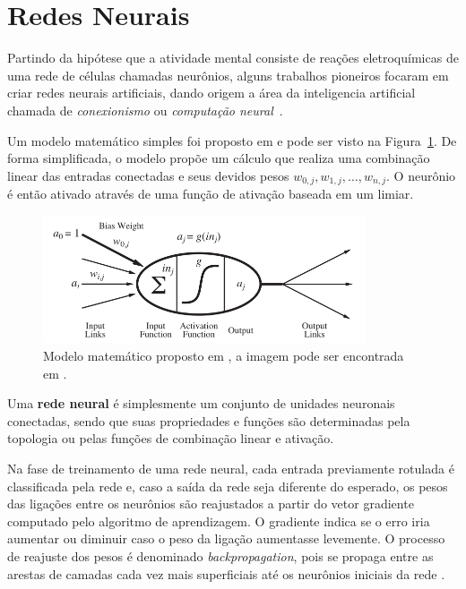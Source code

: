 \section{Redes Neurais}
\label{sec:redesneurais}

Partindo da hipótese que a atividade mental consiste de reações eletroquímicas de uma rede de células chamadas neurônios, alguns trabalhos pioneiros focaram em criar redes neurais artificiais, dando origem a área da inteligencia artificial chamada de \textit{conexionismo} ou \textit{computação neural}~\cite{russel}.

Um modelo matemático simples foi proposto em  e pode ser visto na Figura~\ref{fig:neuron}. De forma simplificada, o modelo propõe um cálculo que realiza uma combinação linear das entradas conectadas e seus devidos pesos $w_{0,j}, w_{1,j}, \dots,w_{n,j}$. O neurônio é então ativado através de uma função de ativação baseada em um limiar.

\begin{figure}[!ht]
  \centering
  \includegraphics[width=0.85\textwidth]{dados/figuras/neuron.png}
  \caption{Modelo matemático proposto em , a imagem pode ser encontrada em \cite{russel}.}
  \label{fig:neuron}
\end{figure}

Uma \textbf{rede neural} é simplesmente um conjunto de unidades neuronais conectadas, sendo que suas propriedades e funções são determinadas pela topologia ou pelas funções de combinação linear e ativação. %

Na fase de treinamento de uma rede neural, cada entrada previamente rotulada é classificada pela rede e, caso a saída da rede seja diferente do esperado, os pesos das ligações entre os neurônios são reajustados a partir do vetor gradiente computado pelo algoritmo de aprendizagem. O gradiente indica se o erro iria aumentar ou diminuir caso o peso da ligação aumentasse levemente. O processo de reajuste dos pesos é denominado \textit{backpropagation}, pois se propaga entre as arestas de camadas cada vez mais superficiais até os neurônios iniciais da rede \cite{lecun2015deep}.

